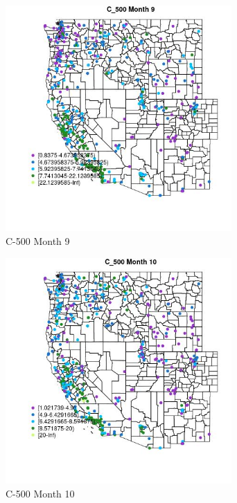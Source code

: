 \begin{figure} 
\centering  
\includegraphics[width=0.77\textwidth]{Code_Outputs/ML_input_report_ML_input_PM25_Step5_part_d_de_duplicated_aves_ML_input_MapObsMo9C_500.jpg} 
\caption{\label{fig:ML_input_report_ML_input_PM25_Step5_part_d_de_duplicated_aves_ML_inputMapObsMo9C_500}C-500 Month 9} 
\end{figure} 
 

\begin{figure} 
\centering  
\includegraphics[width=0.77\textwidth]{Code_Outputs/ML_input_report_ML_input_PM25_Step5_part_d_de_duplicated_aves_ML_input_MapObsMo10C_500.jpg} 
\caption{\label{fig:ML_input_report_ML_input_PM25_Step5_part_d_de_duplicated_aves_ML_inputMapObsMo10C_500}C-500 Month 10} 
\end{figure} 
 

